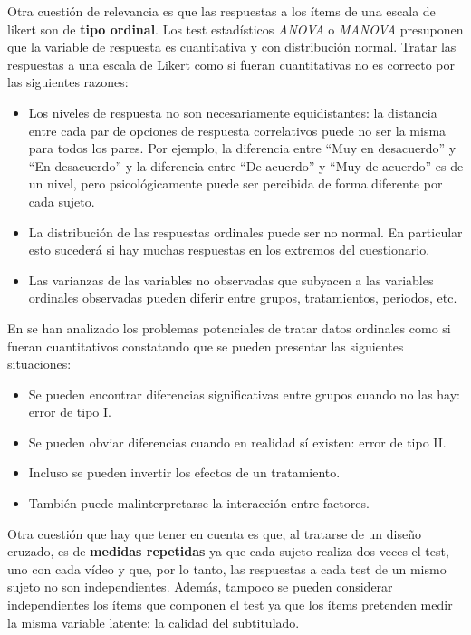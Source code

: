 \documentclass[
  12pt,
  a4paper,
  extrafontsizes,
  onecolumn,
  openright,
  table]{memoir}
\providecommand{\tightlist}{%
  \setlength{\itemsep}{0pt}\setlength{\parskip}{0pt}}\usepackage{longtable,booktabs,array}
\begin{document}
Otra cuestión de relevancia es que las respuestas a los ítems de una
\gls{escala de likert} son de \textbf{tipo ordinal}. Los test
estadísticos \emph{\gls{ANOVA}} o \emph{\gls{MANOVA}} presuponen que la
variable de respuesta es cuantitativa y con distribución normal. Tratar
las respuestas a una escala de Likert como si fueran cuantitativas no es
correcto por las siguientes razones:

\begin{itemize}
\item
  Los niveles de respuesta no son necesariamente equidistantes: la
  distancia entre cada par de opciones de respuesta correlativos puede
  no ser la misma para todos los pares. Por ejemplo, la diferencia entre
  \enquote{Muy en desacuerdo} y \enquote{En desacuerdo} y la diferencia
  entre \enquote{De acuerdo} y \enquote{Muy de acuerdo} es de un nivel,
  pero psicológicamente puede ser percibida de forma diferente por cada
  sujeto.
\item
  La distribución de las respuestas ordinales puede ser no normal. En
  particular esto sucederá si hay muchas respuestas en los extremos del
  cuestionario.
\item
  Las varianzas de las variables no observadas que subyacen a las
  variables ordinales observadas pueden diferir entre grupos,
  tratamientos, periodos, etc.
\end{itemize}

En \textcite{kruschke2018} se han analizado los problemas potenciales de
tratar datos ordinales como si fueran cuantitativos constatando que se
pueden presentar las siguientes situaciones:

\begin{itemize}
\tightlist
\item
  Se pueden encontrar diferencias significativas entre grupos cuando no
  las hay: \gls{error de tipo I}.
\item
  Se pueden obviar diferencias cuando en realidad sí existen:
  \gls{error de tipo II}.
\item
  Incluso se pueden invertir los efectos de un tratamiento.
\item
  También puede malinterpretarse la interacción entre factores.
\end{itemize}

Otra cuestión que hay que tener en cuenta es que, al tratarse de un
diseño cruzado, es de \textbf{medidas repetidas} ya que cada sujeto
realiza dos veces el test, uno con cada vídeo y que, por lo tanto, las
respuestas a cada test de un mismo sujeto no son independientes. Además,
tampoco se pueden considerar independientes los ítems que componen el
test ya que los ítems pretenden medir la misma variable latente: la
calidad del subtitulado.
\end{document}
